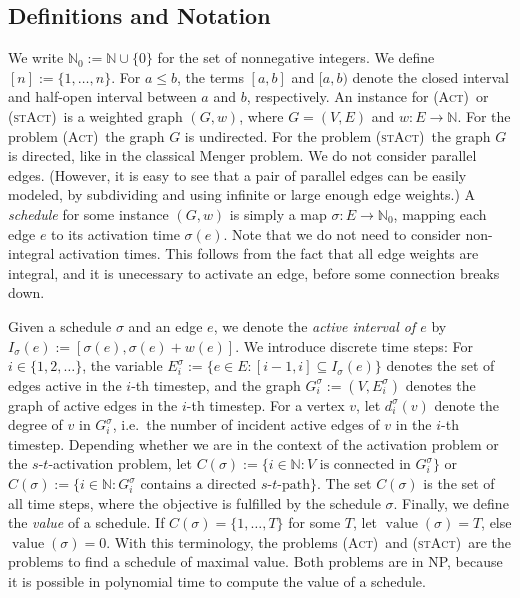 \documentclass[runningheads]{llncs}
\numberwithin{equation}{section}
\newcommand{\N}{\mathbb{N}}
\newcommand{\set}[1]{\{ #1 \}}
\newcommand{\fromto}[2]{\set{#1, \ldots, #2}}
\newcommand{\act}{\textsc{(Act)}}
\newcommand{\stact}{\textsc{(stAct)}}
\DeclareMathOperator{\val}{\text{value}}
\begin{document}
\subsection{Definitions and Notation}
\label{sec_notation}

We write $\N_0 := \N \cup \set{0}$ for the set of nonnegative integers. We define $[n] := \fromto{1}{n}$. For $a \leq b$, the terms $[a, b]$ and $[a, b)$ denote the closed interval and half-open interval between $a$ and $b$, respectively. An instance for \act\ or \stact\ is a weighted graph $(G, w)$, where $G = (V, E)$ and $w : E \rightarrow \N$. For the problem \act\ the graph $G$ is undirected. For the problem \stact\ the graph $G$ is directed, like in the classical Menger problem. We do not consider parallel edges. (However, it is easy to see that a pair of parallel edges can be easily modeled, by subdividing and using infinite or large enough edge weights.) A \emph{schedule} for some instance $(G, w)$ is simply a map $\sigma : E \rightarrow \N_0$, mapping each edge $e$ to its activation time $\sigma(e)$. Note that we do not need to consider non-integral activation times. This follows from the fact that all edge weights are integral, and it is unecessary to activate an edge, before some connection breaks down.

Given a schedule $\sigma$ and an edge $e$, we denote the \emph{active interval of $e$} by $I_\sigma(e) := [\sigma(e), \sigma(e) + w(e)]$. We introduce discrete time steps: For $i \in \{1, 2, \dots\}$, the variable $E^\sigma_i := \set{e \in E : [i-1, i] \subseteq I_\sigma(e)}$ denotes the set of edges active in the $i$-th timestep, and the graph $G^\sigma_i := (V, E^\sigma_i)$ denotes the graph of active edges in the $i$-th timestep. For a vertex $v$, let $d^\sigma_i(v)$ denote the degree of $v$ in $G^\sigma_i$, i.e.\ the number of incident active edges of $v$ in the $i$-th timestep.
Depending whether we are in the context of the activation problem or the $s$-$t$-activation problem, let $C(\sigma) := \set{i \in \N : V \text{ is connected in } G^\sigma_i}$ or  $C(\sigma) := \set{i \in \N : G_i^\sigma \text{ contains a directed $s$-$t$-path}}$. The set $C(\sigma)$ is the set of all time steps, where the objective is fulfilled by the schedule $\sigma$. Finally, we define the \emph{value} of a schedule. If $C(\sigma) = \fromto{1}{T}$ for some $T$, let $\val(\sigma) = T$, else $\val(\sigma) = 0$.
With this terminology, the problems \act\ and \stact\ are the problems to find a schedule of maximal value. Both problems are in NP, because it is possible in polynomial time to compute the value of a schedule. 
\end{document}
